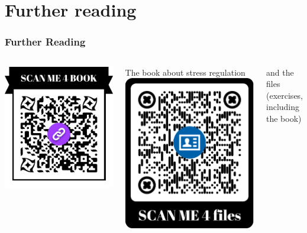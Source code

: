 \documentclass{beamer}
\begin{document}
\section{Further reading}
\begin{frame}
\frametitle{Further Reading}
\begin{columns}[c] %
\includegraphics[width=0.8\linewidth]{QR_Book}


\small{The book about stress regulation}
\includegraphics[width=0.8\linewidth]{QR_Files}


\small{and the files (exercises, including the book)}
\end{columns}
\end{frame}
\end{document}
